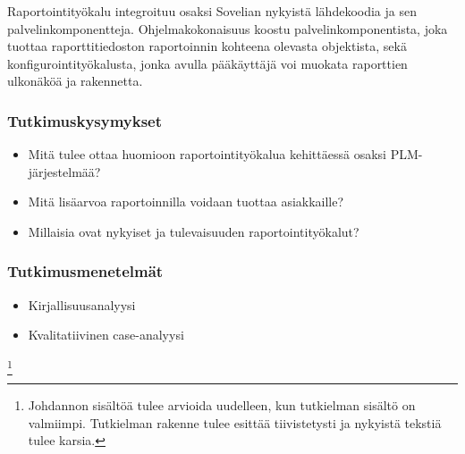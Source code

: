 Raportointityökalu integroituu osaksi Sovelian nykyistä lähdekoodia ja sen palvelinkomponentteja. Ohjelmakokonaisuus koostu palvelinkomponentista, joka tuottaa raporttitiedoston raportoinnin kohteena olevasta objektista, sekä konfigurointityökalusta, jonka avulla pääkäyttäjä voi muokata raporttien ulkonäköä ja rakennetta.

\subsubsection{Tutkimuskysymykset}
\begin{itemize}
\item Mitä tulee ottaa huomioon raportointityökalua kehittäessä osaksi PLM-järjestelmää?
\item Mitä lisäarvoa raportoinnilla voidaan tuottaa asiakkaille?
\item Millaisia ovat nykyiset ja tulevaisuuden raportointityökalut?
\end{itemize}

\subsubsection{Tutkimusmenetelmät}
\begin{itemize}
\item Kirjallisuusanalyysi
\item Kvalitatiivinen case-analyysi
\end{itemize}

\footnote{Johdannon sisältöä tulee arvioida uudelleen, kun tutkielman sisältö on valmiimpi. Tutkielman rakenne tulee esittää tiivistetysti ja nykyistä tekstiä tulee karsia.}
